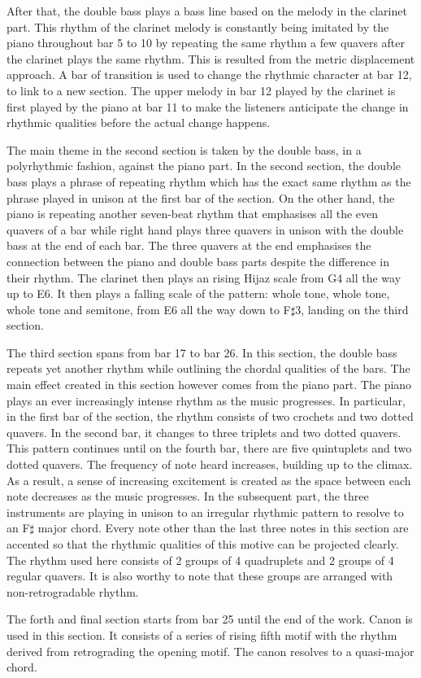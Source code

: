 \documentclass[a4paper]{article}
\begin{document}
After that, the double bass plays a bass line based on the melody in the clarinet part. This rhythm of the clarinet melody is constantly being imitated by the piano throughout bar 5 to 10 by repeating the same rhythm a few quavers after the clarinet plays the same rhythm. This is resulted from the metric displacement approach. A bar of transition is used to change the rhythmic character at bar 12, to link to a new section. The upper melody in bar 12 played by the clarinet is first played by the piano at bar 11 to make the listeners anticipate the change in rhythmic qualities before the actual change happens.\par
The main theme in the second section is taken by the double bass, in a polyrhythmic fashion, against the piano part. In the second section, the double bass plays a phrase of repeating rhythm which has the exact same rhythm as the phrase played in unison at the first bar of the section. On the other hand, the piano is repeating another seven-beat rhythm that emphasises all the even quavers of a bar while right hand plays three quavers in unison with the double bass at the end of each bar. The three quavers at the end emphasises the connection between the piano and double bass parts despite the difference in their rhythm. The clarinet then plays an rising Hijaz scale from G4 all the way up to E6. It then plays a falling scale of the pattern: whole tone, whole tone, whole tone and semitone, from E6 all the way down to F\(\sharp\)3, landing on the third section.\par
The third section spans from bar 17 to bar 26. In this section, the double bass repeats yet another rhythm while outlining the chordal qualities of the bars. The main effect created in this section however comes from the piano part. The piano plays an ever increasingly intense rhythm as the music progresses. In particular, in the first bar of the section, the rhythm consists of two crochets and two dotted quavers. In the second bar, it changes to three triplets and two dotted quavers. This pattern continues until on the fourth bar, there are five quintuplets and two dotted quavers. The frequency of note heard increases, building up to the climax. As a result, a sense of increasing excitement is created as the space between each note decreases as the music progresses. In the subsequent part, the three instruments are playing in unison to an irregular rhythmic pattern to resolve to an F\(\sharp\) major chord. Every note other than the last three notes in this section are accented so that the rhythmic qualities of this motive can be projected clearly. The rhythm used here consists of 2 groups of 4 quadruplets and 2 groups of 4 regular quavers. It is also worthy to note that these groups are arranged with non-retrogradable rhythm.\par
The forth and final section starts from bar 25 until the end of the work. Canon is used in this section. It consists of a series of rising fifth motif with the rhythm derived from retrograding the opening motif. The canon resolves to a quasi-major chord.
\end{document}
